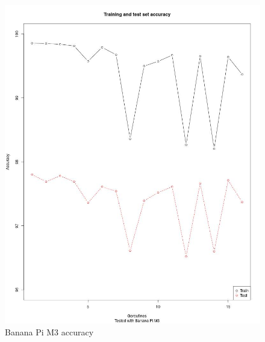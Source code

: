\documentclass[11pt]{article}
\begin{document}
\begin{figure}[H]
	\centering
	\includegraphics[width=1.0\textwidth, height=0.75\textheight]{./Data/Final/Images/bpiMaxTestTrain.jpg}
	\vspace{-1em}
	\caption{Banana Pi M3 accuracy}
	\vspace{-0.5em}
	\label{fig:bpiMaxTestTrain}
\end{figure}
\end{document}

